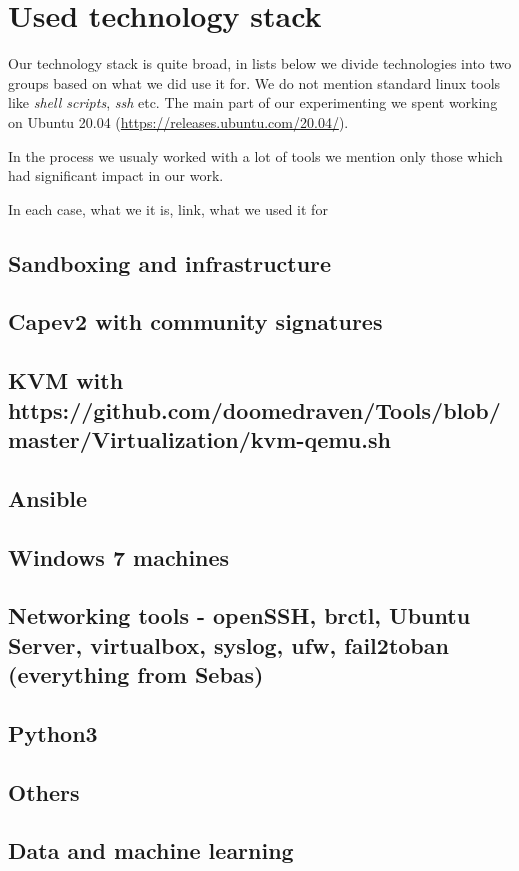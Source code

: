 \chapter{Used technology stack} \label{app:technologies}
Our technology stack is quite broad, in lists below we divide technologies into two groups based on what we did use it for. We do not mention standard linux tools like \emph{shell scripts}, \emph{ssh} etc. The main part of our experimenting we spent working on Ubuntu 20.04 (\url{https://releases.ubuntu.com/20.04/}).

In the process we usualy worked with a lot of tools we mention only those which had significant impact in our work.


In each case, what we it is, link, what we used it for

\section*{Sandboxing and infrastructure}
  \section*{Capev2 with community signatures}
  \section*{KVM with https://github.com/doomedraven/Tools/blob/master/Virtualization/kvm-qemu.sh}
  \section*{Ansible}
  \section*{Windows 7 machines}
  \section*{Networking tools - openSSH, brctl, Ubuntu Server, virtualbox, syslog, ufw, fail2toban (everything from Sebas)}
  \section*{Python3}
  \section*{Others}


\section*{Data and machine learning}
